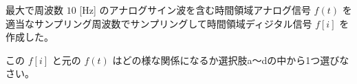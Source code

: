 最大で周波数 $10$ [Hz] のアナログサイン波を含む時間領域アナログ信号 $f(t)$ を適当なサンプリング周波数でサンプリングして時間領域ディジタル信号 $f[i]$ を作成した。\par
この $f[i]$ と元の $f(t)$ はどの様な関係になるか選択肢a〜dの中から1つ選びなさい。

